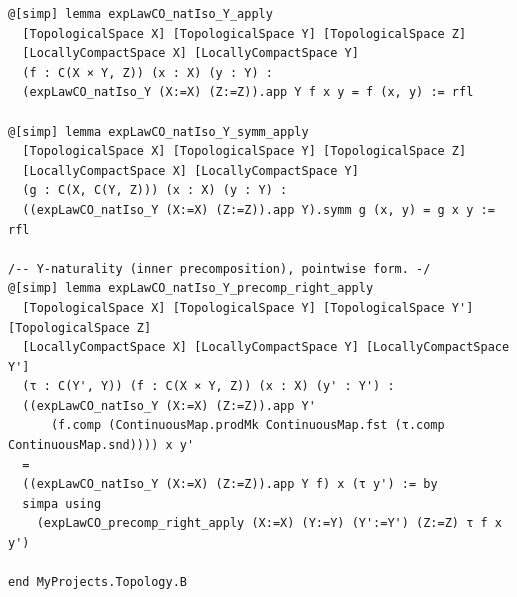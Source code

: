\documentclass[12pt]{article}
\theoremstyle{definition}
\begin{document}
\begin{lstlisting}
@[simp] lemma expLawCO_natIso_Y_apply
  [TopologicalSpace X] [TopologicalSpace Y] [TopologicalSpace Z]
  [LocallyCompactSpace X] [LocallyCompactSpace Y]
  (f : C(X × Y, Z)) (x : X) (y : Y) :
  (expLawCO_natIso_Y (X:=X) (Z:=Z)).app Y f x y = f (x, y) := rfl

@[simp] lemma expLawCO_natIso_Y_symm_apply
  [TopologicalSpace X] [TopologicalSpace Y] [TopologicalSpace Z]
  [LocallyCompactSpace X] [LocallyCompactSpace Y]
  (g : C(X, C(Y, Z))) (x : X) (y : Y) :
  ((expLawCO_natIso_Y (X:=X) (Z:=Z)).app Y).symm g (x, y) = g x y := rfl

/-- Y‑naturality (inner precomposition), pointwise form. -/
@[simp] lemma expLawCO_natIso_Y_precomp_right_apply
  [TopologicalSpace X] [TopologicalSpace Y] [TopologicalSpace Y'] [TopologicalSpace Z]
  [LocallyCompactSpace X] [LocallyCompactSpace Y] [LocallyCompactSpace Y']
  (τ : C(Y', Y)) (f : C(X × Y, Z)) (x : X) (y' : Y') :
  ((expLawCO_natIso_Y (X:=X) (Z:=Z)).app Y'
      (f.comp (ContinuousMap.prodMk ContinuousMap.fst (τ.comp ContinuousMap.snd)))) x y'
  =
  ((expLawCO_natIso_Y (X:=X) (Z:=Z)).app Y f) x (τ y') := by
  simpa using
    (expLawCO_precomp_right_apply (X:=X) (Y:=Y) (Y':=Y') (Z:=Z) τ f x y')

end MyProjects.Topology.B

\end{lstlisting}
\end{document}
